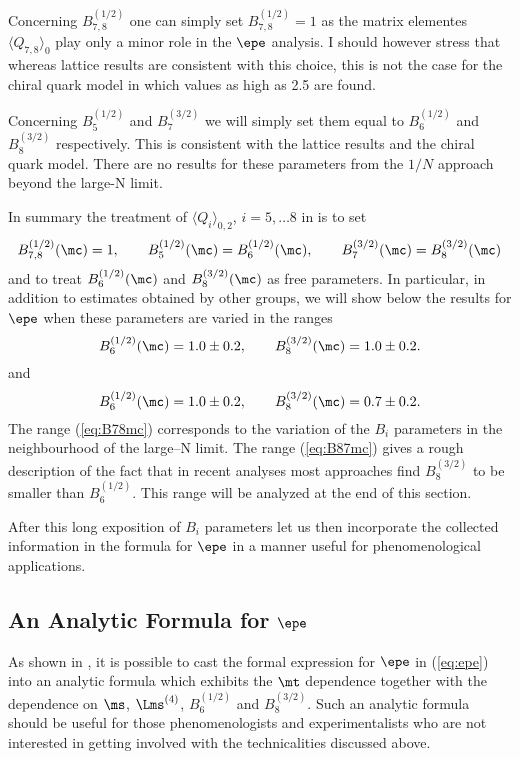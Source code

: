 Concerning $B_{7,8}^{(1/2)}$ one can simply set $B_{7,8}^{(1/2)}=1$ as
the matrix elementes $\langle Q_{7,8} \rangle_0$ play only a minor role
in the $\epe$ analysis. I should however stress that whereas lattice
results are consistent with this choice, this is not the case for
the chiral quark model \cite{TR97} in which values as high 
as 2.5 are found.

Concerning $B_5^{(1/2)}$ and $B_7^{(3/2)}$ we will simply
set them equal to $B^{(1/2)}_{6}$ and $B^{(3/2)}_{8}$ respectively.
This is consistent with the lattice results and the chiral
quark model. There are no results for these parameters from
the $1/N$ approach beyond the large-N limit.

In summary the treatment of $\langle Q_i \rangle_{0,2}$, $i=5,\ldots 8$
in \cite{BJLW,BBL,BJL96a} is to set
\begin{equation}
B_{7,8}^{(1/2)}(\mc) = 1,
\qquad
B_5^{(1/2)}(\mc) = B_6^{(1/2)}(\mc),
\qquad
B_7^{(3/2)}(\mc) = B_8^{(3/2)}(\mc)
\label{eq:B1278mc}
\end{equation}
and to treat $B_6^{(1/2)}(\mc)$ and $B_8^{(3/2)}(\mc)$ as free
parameters. In particular, in addition to estimates obtained
by other groups, we will
show below the results for $\epe$ when these parameters are varied 
in the ranges
\begin{equation}
B_6^{(1/2)}(\mc)=1.0 \pm 0.2,
\qquad
B_8^{(3/2)}(\mc)=1.0\pm 0.2.
\label{eq:B78mc}
\end{equation}
and
\begin{equation}
B_6^{(1/2)}(\mc)=1.0 \pm 0.2,
\qquad
B_8^{(3/2)}(\mc)=0.7\pm 0.2.
\label{eq:B87mc}
\end{equation}
The range (\ref{eq:B78mc}) corresponds to the variation of the $B_i$ parameters
in the neighbourhood of the large--N limit. The range (\ref{eq:B87mc})
gives a rough description of the fact that in recent analyses 
most approaches find $B_8^{(3/2)}$ to be smaller than $B_6^{(1/2)}$.
This range will be analyzed at the end of this section.

After this long exposition of $B_i$ parameters let us then
incorporate the collected information in the formula for
$\epe$ in a manner useful for phenomenological applications.

\subsection{An Analytic Formula for $\epe$}
           \label{subsec:epeanalytic}
As shown in \cite{buraslauten:93}, it is possible to cast the formal
expression for $\epe$ in (\ref{eq:epe})
into an analytic formula which exhibits the $\mt$ dependence
together with the dependence on $\ms$, $\Lms^{(4)}$,
 $B_6^{(1/2)}$ and $B_8^{(3/2)}$.
Such an analytic formula should be useful for those phenomenologists
and experimentalists who are not interested in getting involved with
the technicalities discussed above.

